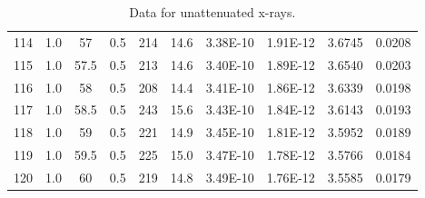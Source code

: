 \documentclass[justified]{tufte-book}
\begin{document}
\begin{table}[ht]
\begin{tabular}{cccccccccc}
114         & 1.0   & 57         & 0.5           & 214     & 14.6       & 3.38E-10    & 1.91E-12       & 3.6745    & 0.0208       \\
115         & 1.0   & 57.5       & 0.5           & 213     & 14.6       & 3.40E-10    & 1.89E-12       & 3.6540    & 0.0203       \\
116         & 1.0   & 58         & 0.5           & 208     & 14.4       & 3.41E-10    & 1.86E-12       & 3.6339    & 0.0198       \\
117         & 1.0   & 58.5       & 0.5           & 243     & 15.6       & 3.43E-10    & 1.84E-12       & 3.6143    & 0.0193       \\
118         & 1.0   & 59         & 0.5           & 221     & 14.9       & 3.45E-10    & 1.81E-12       & 3.5952    & 0.0189       \\
119         & 1.0   & 59.5       & 0.5           & 225     & 15.0       & 3.47E-10    & 1.78E-12       & 3.5766    & 0.0184       \\
120         & 1.0   & 60         & 0.5           & 219     & 14.8       & 3.49E-10    & 1.76E-12       & 3.5585    & 0.0179      
\end{tabular}
\caption{Data for unattenuated x-rays.}
\label{tab:xrcg3}
\end{table}
\end{document}
